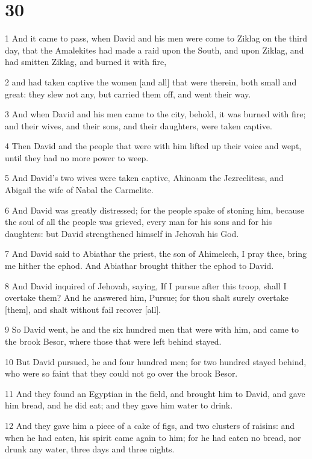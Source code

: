 \chapter{30}

\par 1 And it came to pass, when David and his men were come to Ziklag on the third day, that the Amalekites had made a raid upon the South, and upon Ziklag, and had smitten Ziklag, and burned it with fire,
\par 2 and had taken captive the women [and all] that were therein, both small and great: they slew not any, but carried them off, and went their way.
\par 3 And when David and his men came to the city, behold, it was burned with fire; and their wives, and their sons, and their daughters, were taken captive.
\par 4 Then David and the people that were with him lifted up their voice and wept, until they had no more power to weep.
\par 5 And David's two wives were taken captive, Ahinoam the Jezreelitess, and Abigail the wife of Nabal the Carmelite.
\par 6 And David was greatly distressed; for the people spake of stoning him, because the soul of all the people was grieved, every man for his sons and for his daughters: but David strengthened himself in Jehovah his God.
\par 7 And David said to Abiathar the priest, the son of Ahimelech, I pray thee, bring me hither the ephod. And Abiathar brought thither the ephod to David.
\par 8 And David inquired of Jehovah, saying, If I pursue after this troop, shall I overtake them? And he answered him, Pursue; for thou shalt surely overtake [them], and shalt without fail recover [all].
\par 9 So David went, he and the six hundred men that were with him, and came to the brook Besor, where those that were left behind stayed.
\par 10 But David pursued, he and four hundred men; for two hundred stayed behind, who were so faint that they could not go over the brook Besor.
\par 11 And they found an Egyptian in the field, and brought him to David, and gave him bread, and he did eat; and they gave him water to drink.
\par 12 And they gave him a piece of a cake of figs, and two clusters of raisins: and when he had eaten, his spirit came again to him; for he had eaten no bread, nor drunk any water, three days and three nights.
